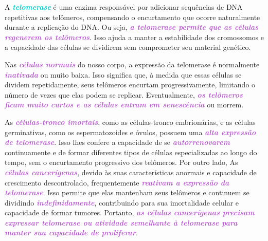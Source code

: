 \documentclass[11pt,a4paper]{article}
\begin{document}
    A \textcolor{DarkTurquoise}{\textbf{\textit{telomerase}}} é uma enzima responsável por adicionar sequências de DNA repetitivas aos telômeros, compensando o encurtamento que ocorre naturalmente durante a replicação do DNA. Ou seja, \textcolor{MediumOrchid}{\textbf{\textit{a telomerase permite que as células regenerem os telômeros}}}. Isso ajuda a manter a estabilidade dos cromossomos e a capacidade das células se dividirem sem comprometer seu material genético.

    Nas \textcolor{MediumOrchid}{\textbf{\textit{células normais}}} do nosso corpo, a expressão da telomerase é normalmente \textcolor{MediumOrchid}{\textbf{\textit{inativada}}} ou muito baixa. Isso significa que, à medida que essas células se dividem repetidamente, seus telômeros encurtam progressivamente, limitando o número de vezes que elas podem se replicar. Eventualmente, \textcolor{MediumOrchid}{\textbf{\textit{os telômeros ficam muito curtos e as células entram em senescência}}} ou morrem.

    As \textcolor{MediumOrchid}{\textbf{\textit{células-tronco imortais}}}, como as células-tronco embrionárias, e as células germinativas, como os espermatozoides e óvulos, possuem uma \textcolor{MediumOrchid}{\textbf{\textit{alta expressão de telomerase}}}. Isso lhes confere a capacidade de se \textcolor{MediumOrchid}{\textbf{\textit{autorrenovarem}}} continuamente e de formar diferentes tipos de células especializadas ao longo do tempo, sem o encurtamento progressivo dos telômeros. Por outro lado, As \textcolor{MediumOrchid}{\textbf{\textit{células cancerígenas}}}, devido às suas características anormais e capacidade de crescimento descontrolado, frequentemente \textcolor{MediumOrchid}{\textbf{\textit{reativam a expressão da telomerase}}}. Isso permite que elas mantenham seus telômeros e continuem se dividindo \textcolor{MediumOrchid}{\textbf{\textit{indefinidamente}}}, contribuindo para sua imortalidade celular e capacidade de formar tumores. Portanto, \textcolor{MediumOrchid}{\textbf{\textit{as células cancerígenas precisam expressar telomerase ou atividade semelhante à telomerase para manter sua capacidade de proliferar}}}.



\end{document}
